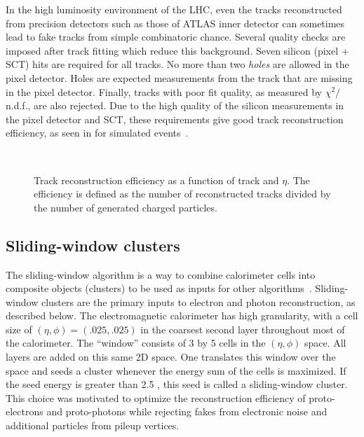 In the high luminosity environment of the LHC, even the tracks reconstructed from precision detectors such as those of ATLAS inner detector can sometimes lead to fake tracks from simple combinatoric chance.
Several quality checks are imposed after track fitting which reduce this background.
Seven silicon (pixel + SCT) hits are required for all tracks.
No more than two \textit{holes} are allowed in the pixel detector.
Holes are expected measurements from the track that are missing in the pixel detector.
Finally, tracks with poor fit quality, as measured by $\chi^2/$n.d.f., are also rejected.
Due to the high quality of the silicon measurements in the pixel detector and SCT, these requirements give good track reconstruction efficiency, as seen in  for simulated events~\cite{Hamano:1489674}.
\begin{figure}
\caption{Track reconstruction efficiency as a function of track \pt and $\eta$.
The efficiency is defined as the number of reconstructed tracks divided by the number of generated charged particles.} \label{fig:track_eff}
 \\
\end{figure}

\subsection{Sliding-window clusters}\label{sec:sliding_window_cluster}

The sliding-window algorithm is a way to combine calorimeter cells into composite objects (clusters) to be used as inputs for other algorithms~\cite{PERF-2013-03}.
Sliding-window clusters are the primary inputs to electron and photon reconstruction, as described below.
The electromagnetic calorimeter has high granularity, with a cell size of $(\eta, \phi) = (.025, .025)$ in the coarsest second layer throughout most of the calorimeter.
The ``window'' consists of 3 by 5 cells in the $(\eta, \phi)$ space.
All layers are added on this same 2D space.
One translates this window over the space and seeds a cluster whenever the energy sum of the cells is maximized.
If the seed energy is greater than 2.5 \GeV, this seed is called a sliding-window cluster.
This choice was motivated to optimize the reconstruction efficiency of proto-electrons and proto-photons while rejecting fakes from electronic noise and additional particles from pileup vertices.


